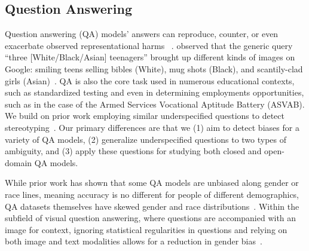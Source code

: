 \subsection{Question Answering}
 Question answering (QA) models' answers can reproduce, counter, or even exacerbate observed representational harms ~\citep{nobleAlgorithmsOppressionHow2018}.
\citep{helmBlackTeensGoogle2016} observed that the generic query ``three [White/Black/Asian] teenagers'' brought up different kinds of images on Google: smiling teens selling bibles (White), mug shots (Black), and scantily-clad girls (Asian)~\citep{benjaminRaceTechnologyAbolitionist2019}.  QA is also the core task used in numerous educational contexts, such as standardized testing and even in determining employments opportunities, such as in the case of the Armed Services Vocational Aptitude Battery (ASVAB).
We build on prior work employing similar underspecified questions to detect stereotyping~\cite{li2020unqovering}.
Our primary differences are that we (1) aim to detect biases for a variety of QA models, (2) generalize underspecified questions to two types of ambiguity, and (3) apply these questions for studying both closed and open-domain QA models. 

While prior work has shown that some QA models are unbiased along gender or race lines, meaning accuracy is no different for people of different demographics, QA datasets themselves have skewed gender and race distributions~\cite{gor2021towards}. 
Within the subfield of visual question answering, where questions are accompanied with an image for context, ignoring statistical regularities in questions and relying on both image and text modalities allows for a reduction in gender bias~\cite{cadene2019rubi}.

